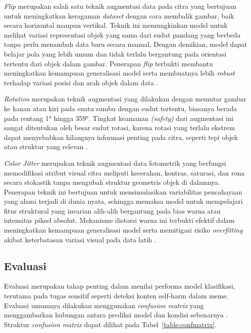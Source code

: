  \label{II.teori11.3.1}

\textit{Flip} merupakan salah satu teknik augmentasi data pada citra yang bertujuan untuk meningkatkan keragaman \textit{dataset} dengan cara membalik gambar, baik secara horizontal maupun vertikal. Teknik ini memungkinkan model untuk melihat variasi representasi objek yang sama dari sudut pandang yang berbeda tanpa perlu menambah data baru secara manual. Dengan demikian, model dapat belajar pola yang lebih umum dan tidak terlalu bergantung pada orientasi tertentu dari objek dalam gambar. Penerapan \textit{flip} terbukti membantu meningkatkan kemampuan generalisasi model serta membuatnya lebih \textit{robust} terhadap variasi posisi dan arah objek dalam data \cite{Xu2023ImageAugmentationSurvey}.

 \label{II.teori11.3.2}

\textit{Rotation} merupakan teknik augmentasi yang dilakukan dengan memutar gambar ke kanan atau kiri pada suatu sumbu dengan sudut tertentu, biasanya berada pada rentang 1° hingga 359°. Tingkat keamanan \textit{(safety)} dari augmentasi ini sangat ditentukan oleh besar sudut rotasi, karena rotasi yang terlalu ekstrem dapat menyebabkan hilangnya informasi penting pada citra, seperti tepi objek atau struktur yang relevan \cite{Shorten2019ImageDataAugmentation}.

 \label{II.teori11.3.3}

\textit{Color Jitter} merupakan teknik augmentasi data fotometrik yang berfungsi memodifikasi atribut visual citra meliputi kecerahan, kontras, saturasi, dan rona secara stokastik tanpa mengubah struktur geometris objek di dalamnya. Penerapan teknik ini bertujuan untuk mensimulasikan variabilitas pencahayaan yang alami terjadi di dunia nyata, sehingga memaksa model untuk mempelajari fitur struktural yang invarian alih-alih bergantung pada bias warna atau intensitas piksel absolut. Mekanisme distorsi warna ini terbukti efektif dalam meningkatkan kemampuan generalisasi model serta memitigasi risiko \textit{overfitting} akibat keterbatasan variasi visual pada data latih \cite{Shorten2019ImageDataAugmentation}.

\subsection{Evaluasi} \label{II.teori12}
Evaluasi merupakan tahap penting dalam menilai performa model klasifikasi, terutama pada tugas sensitif seperti deteksi konten self-harm dalam meme. Evaluasi umumnya dilakukan menggunakan \textit{confusion matrix} yang menggambarkan hubungan antara prediksi model dan kondisi sebenarnya \cite{fawcett2006introduction}. Struktur \textit{confusion matrix} dapat dilihat pada Tabel~\ref{table:confmatrix}.

